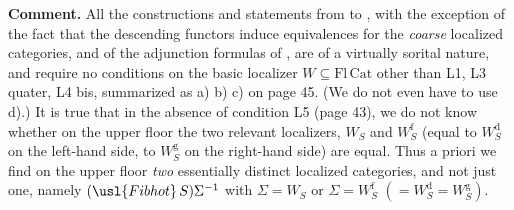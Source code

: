 \textbf{Comment.} All the constructions and statements from  to , with the exception of the fact that the descending functors induce equivalences for the \textit{coarse} localized categories, and of the adjunction formulas of , are of a virtually sorital nature, and require no conditions on the basic localizer $W \subseteq \mathrm{Fl}\,\mathrm{Cat}$ other than L1, L3 quater, L4 bis, summarized as a) b) c) on page 45. (We do not even have to use d).) It is true that in the absence of condition L5 (page 43), we do not know whether on the upper floor the two relevant localizers, $W_S$ and $W_S^{\mathrm{f}}$ (equal to $W_S^{\mathrm{d}}$ on the left-hand side, to $W_S^{\mathrm{g}}$ on the right-hand side) are equal. Thus a priori we find on the upper floor \textit{two} essentially distinct localized categories, and not just one, namely $(\usl{Fibhot}\,S)\Sigma^{-1}$ with $\Sigma = W_S$ or $\Sigma = W_S^{\mathrm{f}}$ $(= W_S^{\mathrm{d}} = W_S^{\mathrm{g}})$.

